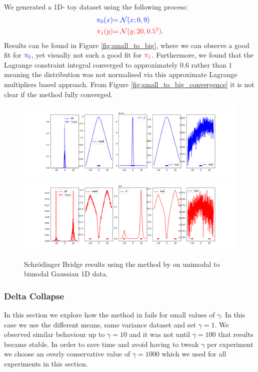 \documentclass[a4paper,12pt,twoside,openright]{report}
\theoremstyle{definition}
\begin{document}
We generated a 1D- toy dataset using the following process:
\begin{align*}
     \color{blue}{\pi_0(x)} &\color{blue}{= {\mathcal{N}}(x; 0,  9)} \\
    \color{red}{\pi_1(y)} &\color{red}{= {\mathcal{N}}(y; 20, 0.5 ^2)}. 
\end{align*}
Results can be found in Figure \ref{fig:small_to_big}, where we can observe a good fit for $\color{blue}{\pi_0}$, yet visually not such a good fit for $\color{red}{\pi_1}$. Furthermore, we found that the Lagrange constraint integral converged to approximately $0.6$ rather than $1$ meaning the distribution was not normalised via this approximate Lagrange multipliers based approach. From Figure \ref{fig:small_to_big_convergence} it is not clear if the method fully converged. 
\begin{figure}[t]
    \centering
     \includegraphics[scale=0.4,trim={2.3cm 0.2cm 1.5cm 0}, clip]{images/Pavon/Forward_bimodal_test_working.png} \\ \vspace{-0.2cm}
    \includegraphics[scale=0.4,trim={2.3cm 0 1.5cm 1.5cm}, clip]{images/Pavon/Backward_bimodal_test_working.png} 
    \caption{Schrödinger Bridge results using the method by \cite{pavon2018data} on unimodal to bimodal Gaussian 1D data. }
    \label{fig:pavon_bimodal}
\end{figure}
\subsubsection{Delta Collapse}
In this section we explore how the method in \cite{pavon2018data} fails for small values of $\gamma$. In this case we use the different means, same variance dataset and set $\gamma=1$. We observed similar behaviour up to $\gamma=10$ and it was not until $\gamma=100$ that results became stable. In order to save time and avoid having to tweak $\gamma$ per experiment we choose an overly conservative value of $\gamma=1000$ which we used for all experiments in this section.
\end{document}
